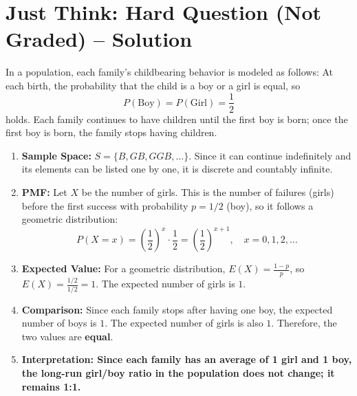 \documentclass[12pt,a4paper]{article}
\begin{document}
\vspace{1cm}
\section*{\textbf{\color{TitleColor}Just Think: Hard Question (Not Graded) -- Solution}}

In a population, each family's childbearing behavior is modeled as follows: At each birth, the probability that the child is a boy or a girl is equal, so
\[
P(\text{Boy}) = P(\text{Girl}) = \frac{1}{2}
\]
holds. Each family continues to have children until the first boy is born; once the first boy is born, the family stops having children.

\begin{enumerate}
    \item[\textbf{a)}] \textbf{Sample Space:} $S = \{B, GB, GGB, \dots\}$. Since it can continue indefinitely and its elements can be listed one by one, it is discrete and countably infinite.
    
    \item[\textbf{b)}] \textbf{PMF:} Let $X$ be the number of girls. This is the number of failures (girls) before the first success with probability $p=1/2$ (boy), so it follows a geometric distribution:
    \[
    P(X=x) = \left(\frac{1}{2}\right)^x \cdot \frac{1}{2} = \left(\frac{1}{2}\right)^{x+1}, \quad x=0, 1, 2, \dots
    \]
    
    \item[\textbf{c)}] \textbf{Expected Value:} For a geometric distribution, $E(X) = \frac{1-p}{p}$, so $E(X) = \frac{1/2}{1/2} = 1$. The expected number of girls is $1$.
    
    \item[\textbf{d)}] \textbf{Comparison:} Since each family stops after having one boy, the expected number of boys is $1$. The expected number of girls is also $1$. Therefore, the two values are \textbf{equal}.
    
    \item[\textbf{\color{ChoiceColor}e)}] \textcolor{ChoiceColor}{\textbf{Interpretation: Since each family has an average of 1 girl and 1 boy, the long-run girl/boy ratio in the population does not change; it remains 1:1.}}
\end{enumerate}
\end{document}
